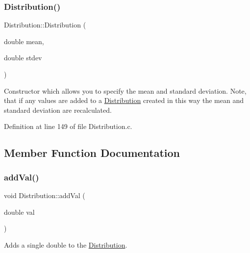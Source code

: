 \mbox{\label{class_world_architect_1_1_distribution_ae8b48b89df0dbc5d326b22789a014a3a}} 
\subsubsection{\texorpdfstring{Distribution()}{Distribution()}\hspace{0.1cm}{\footnotesize\ttfamily [2/2]}}
{\footnotesize\ttfamily Distribution\+::\+Distribution (\begin{DoxyParamCaption}\item[{double}]{mean,  }\item[{double}]{stdev }\end{DoxyParamCaption})}

Constructor which allows you to specify the mean and standard deviation. Note, that if any values are added to a \mbox{\hyperlink{class_world_architect_1_1_distribution}{Distribution}} created in this way the mean and standard deviation are recalculated. 

Definition at line 149 of file Distribution.\+c.



\subsection{Member Function Documentation}
\mbox{\label{class_world_architect_1_1_distribution_a406368b730c3a22d7cbc84d1a00f544e}} 
\subsubsection{\texorpdfstring{addVal()}{addVal()}}
{\footnotesize\ttfamily void Distribution\+::add\+Val (\begin{DoxyParamCaption}\item[{double}]{val }\end{DoxyParamCaption})}



Adds a single double to the \mbox{\hyperlink{class_world_architect_1_1_distribution}{Distribution}}. 



